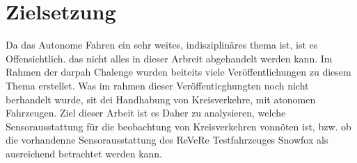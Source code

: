 \section{Zielsetzung}
Da das Autonome Fahren ein sehr weites, indisziplinäres thema ist, ist es Offensichtlich. das nicht alles in dieser Arbreit abgehandelt werden kann.
Im Rahmen der darpah Chalenge wurden beiteits viele Veröffentlichungen zu diesem Thema erstellet.
Was im rahmen dieser Veröffenticghungten noch nicht berhandelt wurde, sit dei Handhabung von Kreisverkehre, mit atonomen Fahrzeugen.
Ziel dieser Arbeit ist es Daher zu analysieren, welche Sensorausstattung für die beobachtung von Kreisverkehren vonnöten ist, bzw. ob die vorhandenne Sensorausstattung des ReVeRe Testfahrzeuges Snowfox
als ausreichend betrachtet werden kann.

